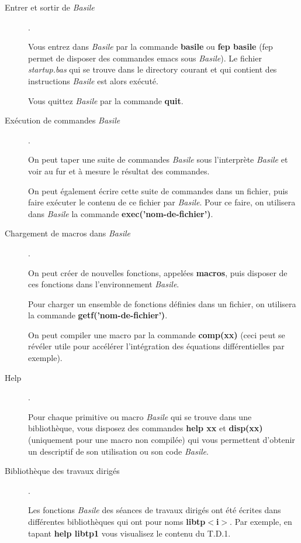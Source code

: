 \begin{description}

\item[Entrer et sortir de {\em Basile}] .

Vous entrez dans {\em Basile} par la commande {\bf basile} ou {\bf fep basile}
 (fep permet de disposer des commandes emacs sous {\em Basile}). Le 
 fichier {\em startup.bas} qui se trouve dans le directory courant 
et qui contient des instructions {\em Basile} est alors ex\'ecut\'e.

Vous quittez {\em Basile} par la commande {\bf quit}.

\item[Ex\'ecution de commandes {\em Basile}] .

On peut taper une suite de commandes {\em Basile} sous l'inter\-pr\`e\-te 
 {\em Basile} et voir au fur et \`a mesure le r\'esultat des commandes.

On peut \'egalement \'ecrire cette suite de commandes dans un fichier,
 puis faire  ex\'ecuter  le contenu de ce  fichier par {\em Basile}. 
 Pour ce faire, on utilisera dans {\em Basile}  la commande
  {\bf exec('nom-de-fichier')}. 


\item[Chargement de macros dans {\em Basile}] .

On peut cr\'eer de nouvelles fonctions, 
 appel\'ees {\bf macros}, puis
 disposer de ces fonctions dans l'en\-vi\-ron\-ne\-ment {\em Basile}.
 
Pour charger  un ensemble de fonctions d\'efinies dans un fichier,
 on utilisera la commande {\bf getf('nom-de-fichier')}.

On peut compiler une macro par la 
 commande {\bf comp{(xx)}} (ceci peut se r\'ev\'eler utile pour 
 acc\'el\'erer  l'int\'egration des \'equations diff\'erentielles
par exemple).

\item[Help] .

Pour chaque primitive ou macro {\em Basile} qui se trouve dans une 
biblioth\`eque, vous disposez des commandes 
{\bf help xx} et {\bf disp(xx)} (uniquement pour une macro non compil\'ee)
  qui vous permettent d'obtenir un descriptif de son utilisation  
  ou son code {\em Basile}.


\item[Biblioth\`eque des travaux dirig\'es] .

Les fonctions {\em Basile} des s\'eances de travaux dirig\'es ont \'et\'e 
\'ecrites dans diff\'erentes 
 biblioth\`eques qui ont pour noms 
{\bf libtp$<$i$>$}. Par exemple, en tapant {\bf help libtp1} vous 
visualisez le contenu du T.D.1.


\end{description}
